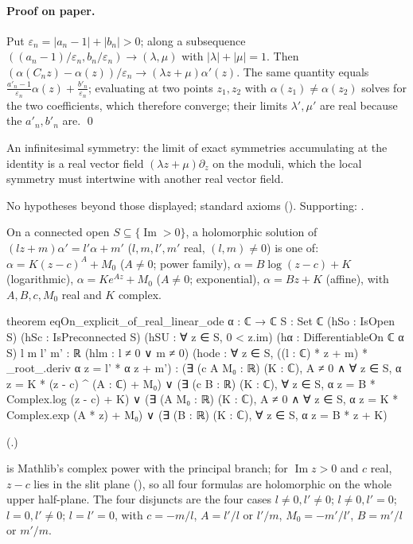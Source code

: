 \paragraph{Proof on paper.}  Put $\varepsilon_n=|a_n-1|+|b_n|>0$; along a subsequence $((a_n-1)/\varepsilon_n,b_n/\varepsilon_n)\to(\lambda,\mu)$ with
$|\lambda|+|\mu|=1$.  Then $(\alpha(C_nz)-\alpha(z))/\varepsilon_n\to(\lambda z+\mu)\alpha'(z)$.  The same quantity equals
$\frac{a'_n-1}{\varepsilon_n}\alpha(z)+\frac{b'_n}{\varepsilon_n}$; evaluating at two points $z_1,z_2$ with $\alpha(z_1)\ne\alpha(z_2)$ solves for the two
coefficients, which therefore converge; their limits $\lambda',\mu'$ are real because the $a'_n,b'_n$ are. \qed
\begin{physics}An infinitesimal symmetry: the limit of exact symmetries accumulating at the identity is a real vector field
$(\lambda z+\mu)\partial_z$ on the moduli, which the local symmetry must intertwine with another real vector field.\end{physics}
\begin{status}No hypotheses beyond those displayed; standard axioms ().
Supporting: .\end{status}

\begin{theorem}\label{ch19:thm:families}
On a connected open $S\subseteq\{\operatorname{Im}>0\}$, a holomorphic solution of $(lz+m)\alpha'=l'\alpha+m'$ ($l,m,l',m'$ real,
$(l,m)\ne0$) is one of: $\alpha=K(z-c)^A+M_0$ ($A\ne0$; power family), $\alpha=B\log(z-c)+K$ (logarithmic), $\alpha=Ke^{Az}+M_0$ ($A\ne0$;
exponential), $\alpha=Bz+K$ (affine), with $A,B,c,M_0$ real and $K$ complex.
\end{theorem}
\begin{leancode}
theorem eqOn_explicit_of_real_linear_ode {α : ℂ → ℂ} {S : Set ℂ} (hSo : IsOpen S)
    (hSc : IsPreconnected S) (hSU : ∀ z ∈ S, 0 < z.im) (hα : DifferentiableOn ℂ α S)
    {l m l' m' : ℝ} (hlm : l ≠ 0 ∨ m ≠ 0)
    (hode : ∀ z ∈ S, ((l : ℂ) * z + m) * _root_.deriv α z = l' * α z + m') :
    (∃ (c A M₀ : ℝ) (K : ℂ), A ≠ 0 ∧ ∀ z ∈ S, α z = K * (z - c) ^ (A : ℂ) + M₀) ∨
    (∃ (c B : ℝ) (K : ℂ), ∀ z ∈ S, α z = B * Complex.log (z - c) + K) ∨
    (∃ (A M₀ : ℝ) (K : ℂ), A ≠ 0 ∧ ∀ z ∈ S, α z = K * Complex.exp (A * z) + M₀) ∨
    (∃ (B : ℝ) (K : ℂ), ∀ z ∈ S, α z = B * z + K)
\end{leancode}
(.)
\begin{dictionary}
 is Mathlib's complex power with the principal branch; for $\operatorname{Im}z>0$ and $c$ real, $z-c$ lies in the
slit plane (), so all four formulas are holomorphic on the whole upper half-plane.  The four
disjuncts are the four cases $l\ne0,l'\ne0$; $l\ne0,l'=0$; $l=0,l'\ne0$; $l=l'=0$, with $c=-m/l$, $A=l'/l$ or $l'/m$, $M_0=-m'/l'$,
$B=m'/l$ or $m'/m$.
\end{dictionary}
